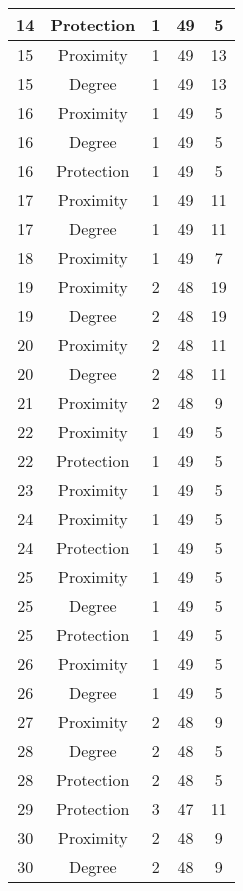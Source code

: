 \documentclass[results.tex]{subfiles}
\begin{document}
\begin{center}
\begin{tabular}{| c || c | c | c | c |}
    \hline
    14 & Protection & 1 & 49 & 5 \\ 
    \hline
    15 & Proximity & 1 & 49 & 13 \\ 
    \hline
    15 & Degree & 1 & 49 & 13 \\ 
    \hline
    16 & Proximity & 1 & 49 & 5 \\ 
    \hline
    16 & Degree & 1 & 49 & 5 \\ 
    \hline
    16 & Protection & 1 & 49 & 5 \\ 
    \hline
    17 & Proximity & 1 & 49 & 11 \\ 
    \hline
    17 & Degree & 1 & 49 & 11 \\ 
    \hline
    18 & Proximity & 1 & 49 & 7 \\ 
    \hline
    19 & Proximity & 2 & 48 & 19 \\ 
    \hline
    19 & Degree & 2 & 48 & 19 \\ 
    \hline
    20 & Proximity & 2 & 48 & 11 \\ 
    \hline
    20 & Degree & 2 & 48 & 11 \\ 
    \hline
    21 & Proximity & 2 & 48 & 9 \\ 
    \hline
    22 & Proximity & 1 & 49 & 5 \\ 
    \hline
    22 & Protection & 1 & 49 & 5 \\ 
    \hline
    23 & Proximity & 1 & 49 & 5 \\ 
    \hline
    24 & Proximity & 1 & 49 & 5 \\ 
    \hline
    24 & Protection & 1 & 49 & 5 \\ 
    \hline
    25 & Proximity & 1 & 49 & 5 \\ 
    \hline
    25 & Degree & 1 & 49 & 5 \\ 
    \hline
    25 & Protection & 1 & 49 & 5 \\ 
    \hline
    26 & Proximity & 1 & 49 & 5 \\ 
    \hline
    26 & Degree & 1 & 49 & 5 \\ 
    \hline
    27 & Proximity & 2 & 48 & 9 \\ 
    \hline
    28 & Degree & 2 & 48 & 5 \\ 
    \hline
    28 & Protection & 2 & 48 & 5 \\ 
    \hline
    29 & Protection & 3 & 47 & 11 \\ 
    \hline
    30 & Proximity & 2 & 48 & 9 \\ 
    \hline
    30 & Degree & 2 & 48 & 9 \\ 
    \hline

\end{tabular}
\end{center}
\end{document}
